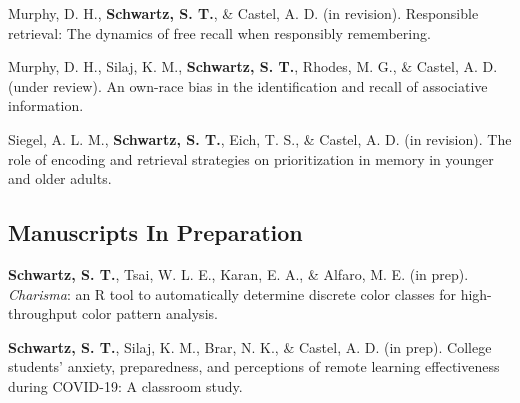 Murphy, D. H., \textbf{Schwartz, S. T.}, \& Castel, A. D. (in revision). Responsible retrieval: The dynamics of free recall when responsibly remembering.

\pubspace

Murphy, D. H., Silaj, K. M., \textbf{Schwartz, S. T.}, Rhodes, M. G., \& Castel, A. D. (under review). An own-race bias in the identification and recall of associative information.

\pubspace

Siegel, A. L. M., \textbf{Schwartz, S. T.}, Eich, T. S., \& Castel, A. D. (in revision). The role of encoding and retrieval strategies on prioritization in memory in younger and older adults.

\subsection*{Manuscripts In Preparation}
\textbf{Schwartz, S. T.}, Tsai, W. L. E., Karan, E. A., \& Alfaro, M. E. (in prep). \textit{Charisma}: an R tool to automatically determine discrete color classes for high-throughput color pattern analysis.

\pubspace

\textbf{Schwartz, S. T.}, Silaj, K. M., Brar, N. K., \& Castel, A. D. (in prep). College students’ anxiety, preparedness, and perceptions of remote learning effectiveness during COVID-19: A classroom study.




